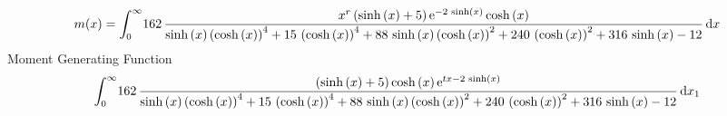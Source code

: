 \documentclass[12pt]{article}
\begin{document}
 $$ m(x) = \int_{0}^{\infty }\!162\,{\frac {{x}^{r} \left( \sinh \left( x
 \right) +5 \right) {{\rm e}^{-2\,\sinh \left( x \right) }}\cosh
 \left( x \right) }{\sinh \left( x \right)  \left( \cosh \left( x
 \right)  \right) ^{4}+15\, \left( \cosh \left( x \right)  \right) ^{4
}+88\,\sinh \left( x \right)  \left( \cosh \left( x \right)  \right) ^
{2}+240\, \left( \cosh \left( x \right)  \right) ^{2}+316\,\sinh
 \left( x \right) -12}}\,{\rm d}x
$$ Moment Generating Function 
 $$\int_{0}^{\infty }\!162\,{\frac { \left( \sinh \left( x \right) +5
 \right) \cosh \left( x \right) {{\rm e}^{tx-2\,\sinh \left( x
 \right) }}}{\sinh \left( x \right)  \left( \cosh \left( x \right) 
 \right) ^{4}+15\, \left( \cosh \left( x \right)  \right) ^{4}+88\,
\sinh \left( x \right)  \left( \cosh \left( x \right)  \right) ^{2}+
240\, \left( \cosh \left( x \right)  \right) ^{2}+316\,\sinh \left( x
 \right) -12}}\,{\rm d}x_{{1}}
$$
\end{document}
